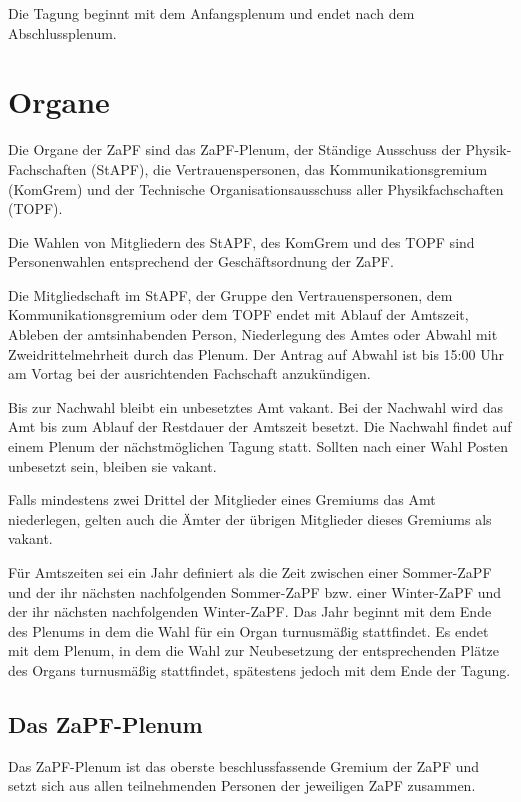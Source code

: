 \documentclass[
  a4paper,
  oneside]{scrartcl}
\begin{document}
Die Tagung beginnt mit dem Anfangsplenum und endet nach dem
Abschlussplenum.

\hypertarget{organe}{%
\section{Organe}\label{organe}}

Die Organe der ZaPF sind das ZaPF-Plenum, der Ständige Ausschuss der
Physik-Fachschaften (StAPF), die Vertrauenspersonen, das
Kommunikationsgremium (KomGrem) und der Technische
Organisationsausschuss aller Physikfachschaften (TOPF).

Die Wahlen von Mitgliedern des StAPF, des KomGrem und des TOPF sind
Personenwahlen entsprechend der Geschäftsordnung der ZaPF.

Die Mitgliedschaft im StAPF, der Gruppe den Vertrauenspersonen, dem
Kommunikationsgremium oder dem TOPF endet mit Ablauf der Amtszeit,
Ableben der amtsinhabenden Person, Niederlegung des Amtes oder Abwahl
mit Zweidrittelmehrheit durch das Plenum. Der Antrag auf Abwahl ist bis
15:00 Uhr am Vortag bei der ausrichtenden Fachschaft anzukündigen.

Bis zur Nachwahl bleibt ein unbesetztes Amt vakant. Bei der Nachwahl
wird das Amt bis zum Ablauf der Restdauer der Amtszeit besetzt. Die
Nachwahl findet auf einem Plenum der nächstmöglichen Tagung statt.
Sollten nach einer Wahl Posten unbesetzt sein, bleiben sie vakant.

Falls mindestens zwei Drittel der Mitglieder eines Gremiums das Amt
niederlegen, gelten auch die Ämter der übrigen Mitglieder dieses
Gremiums als vakant.

Für Amtszeiten sei ein Jahr definiert als die Zeit zwischen einer
Sommer-ZaPF und der ihr nächsten nachfolgenden Sommer-ZaPF bzw. einer
Winter-ZaPF und der ihr nächsten nachfolgenden Winter-ZaPF. Das Jahr
beginnt mit dem Ende des Plenums in dem die Wahl für ein Organ
turnusmäßig stattfindet. Es endet mit dem Plenum, in dem die Wahl zur
Neubesetzung der entsprechenden Plätze des Organs turnusmäßig
stattfindet, spätestens jedoch mit dem Ende der Tagung.

\hypertarget{das-zapf-plenum}{%
\subsection{Das ZaPF-Plenum}\label{das-zapf-plenum}}

Das ZaPF-Plenum ist das oberste beschlussfassende Gremium der ZaPF und
setzt sich aus allen teilnehmenden Personen der jeweiligen ZaPF
zusammen.
\end{document}
